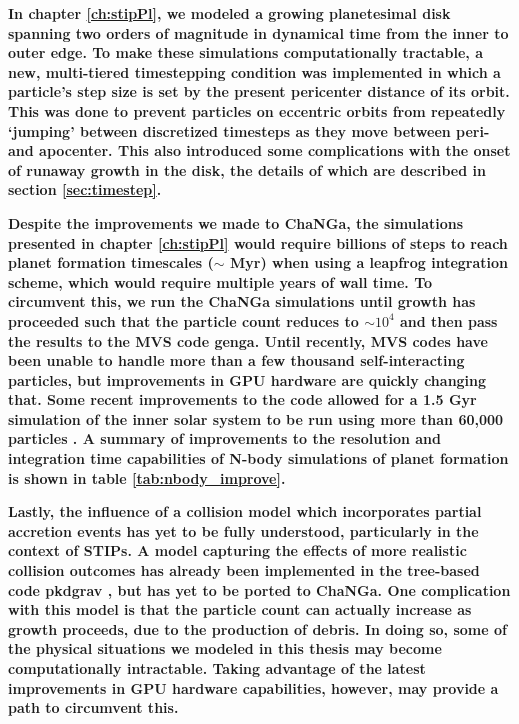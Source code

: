 \textbf{In chapter \ref{ch:stipPl}, we modeled a growing planetesimal disk spanning two orders of magnitude in dynamical time from the inner to outer edge. To make these simulations computationally tractable, a new, multi-tiered timestepping condition was implemented in which a particle's step size is set by the present pericenter distance of its orbit. This was done to prevent particles on eccentric orbits from repeatedly `jumping' between discretized timesteps as they move between peri- and apocenter. This also introduced some complications with the onset of runaway growth in the disk, the details of which are described in section \ref{sec:timestep}.}

\textbf{Despite the improvements we made to {\sc ChaNGa}, the simulations presented in chapter \ref{ch:stipPl} would require billions of steps to reach planet formation timescales ($\sim$ Myr) when using a leapfrog integration scheme, which would require multiple years of wall time. To circumvent this, we run the {\sc ChaNGa} simulations until growth has proceeded such that the particle count reduces to $\sim 10^{4}$ and then pass the results to the MVS code {\sc genga}. Until recently, MVS codes have been unable to handle more than a few thousand self-interacting particles, but improvements in GPU hardware are quickly changing that. Some recent improvements to the code allowed for a 1.5 Gyr simulation of the inner solar system to be run using more than 60,000 particles \cite{grimm22}. A summary of improvements to the resolution and integration time capabilities of N-body simulations of planet formation is shown in table \ref{tab:nbody_improve}.}

\textbf{Lastly, the influence of a collision model which incorporates partial accretion events has yet to be fully understood, particularly in the context of STIPs. A model capturing the effects of more realistic collision outcomes has already been implemented in the tree-based code {\sc pkdgrav} \cite{leinhardt12, leinhardt15}, but has yet to be ported to {\sc ChaNGa}. One complication with this model is that the particle count can actually increase as growth proceeds, due to the production of debris. In doing so, some of the physical situations we modeled in this thesis may become computationally intractable. Taking advantage of the latest improvements in GPU hardware capabilities, however, may provide a path to circumvent this.}

